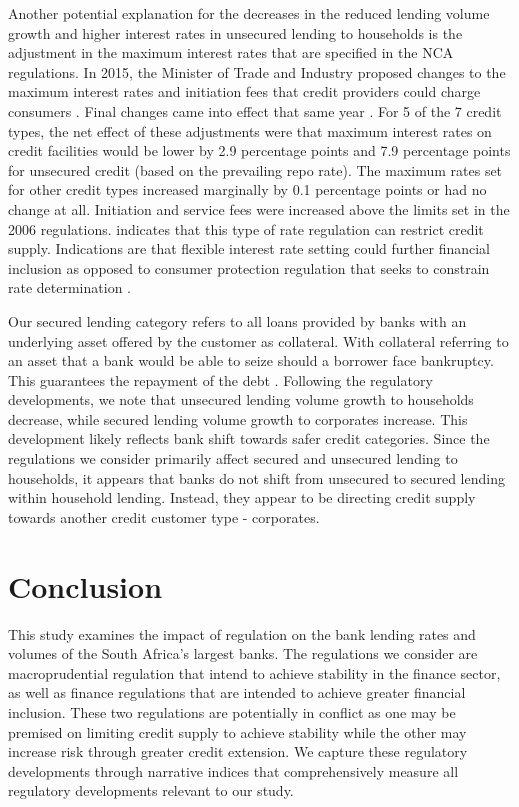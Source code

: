 \documentclass[
  letterpaper,
  DIV=11,
  numbers=noendperiod]{scrartcl}
\begin{document}
Another potential explanation for the decreases in the reduced lending
volume growth and higher interest rates in unsecured lending to
households is the adjustment in the maximum interest rates that are
specified in the NCA regulations. In 2015, the Minister of Trade and
Industry proposed changes to the maximum interest rates and initiation
fees that credit providers could charge consumers
\citep{regulations2015b}. Final changes came into effect that same year
\citep{regulations2015c}. For 5 of the 7 credit types, the net effect of
these adjustments were that maximum interest rates on credit facilities
would be lower by 2.9 percentage points and 7.9 percentage points for
unsecured credit (based on the prevailing repo rate). The maximum rates
set for other credit types increased marginally by 0.1 percentage points
or had no change at all. Initiation and service fees were increased
above the limits set in the 2006 regulations. \citet{yoshino2016}
indicates that this type of rate regulation can restrict credit supply.
Indications are that flexible interest rate setting could further
financial inclusion as opposed to consumer protection regulation that
seeks to constrain rate determination \citep{barua2016}.

Our secured lending category refers to all loans provided by banks with
an underlying asset offered by the customer as collateral. With
collateral referring to an asset that a bank would be able to seize
should a borrower face bankruptcy. This guarantees the repayment of the
debt \citep{freixas1997}. Following the regulatory developments, we note
that unsecured lending volume growth to households decrease, while
secured lending volume growth to corporates increase. This development
likely reflects bank shift towards safer credit categories. Since the
regulations we consider primarily affect secured and unsecured lending
to households, it appears that banks do not shift from unsecured to
secured lending within household lending. Instead, they appear to be
directing credit supply towards another credit customer type -
corporates.

\section{Conclusion}\label{conclusion}

This study examines the impact of regulation on the bank lending rates
and volumes of the South Africa's largest banks. The regulations we
consider are macroprudential regulation that intend to achieve stability
in the finance sector, as well as finance regulations that are intended
to achieve greater financial inclusion. These two regulations are
potentially in conflict as one may be premised on limiting credit supply
to achieve stability while the other may increase risk through greater
credit extension. We capture these regulatory developments through
narrative indices that comprehensively measure all regulatory
developments relevant to our study.
\end{document}
